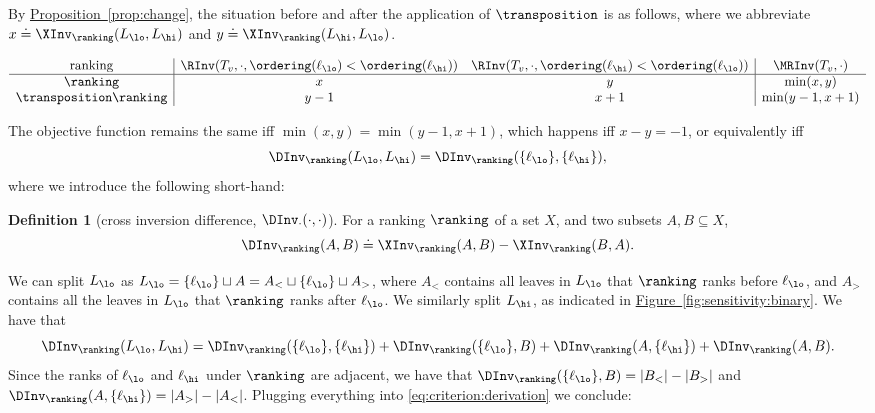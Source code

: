 \documentclass[11pt]{article}
\numberwithin{equation}{section}
\theoremstyle{definition}
\newtheorem{definition}[theorem]{Definition}
\theoremstyle{plain}
\newcommand{\expref}[2]{\hyperref[#2]{#1~\ref{#2}}}
\begin{document}
By \expref{Proposition}{prop:change}, the situation before and after the application of $\transposition$ is as follows, where we abbreviate $x \doteq \XInv_\ranking(L_\lo,L_\hi)$ and $y \doteq \XInv_\ranking(L_\hi,L_\lo)$. 

\begin{equation*}
    \begin{array}{c|cc|c}
      \text{ranking} & \RInv(T_v,\cdot, \ordering(\ell_\lo) < \ordering(\ell_\hi)) &  \RInv(T_v,\cdot, \ordering(\ell_\hi) < \ordering(\ell_\lo)) & \MRInv(T_v,\cdot) \\
      \hline
      \ranking & x & y & \min(x,y) \\
      \transposition \ranking & y-1 & x+1 & \min(y-1,x+1)
    \end{array}
\end{equation*}

The objective function remains the same iff $\min(x,y) = \min(y-1,x+1)$, which happens iff $x-y=-1$, or equivalently iff
\begin{equation}\label{eq:criterion:derivation}
\DInv_\ranking(L_\lo,L_\hi) = \DInv_\ranking(\{\ell_\lo\},\{\ell_\hi\}),
\end{equation}
where we introduce the following short-hand: 
\begin{definition}[cross inversion difference, $\DInv_{\cdot}(\cdot,\cdot)$]
For a ranking $\ranking$ of a set $X$, and two subsets $A, B \subseteq X$,
\[ \DInv_\ranking(A,B) \doteq \XInv_\ranking(A,B) - \XInv_\ranking(B,A). \]
\end{definition}
We can split $L_\lo$ as $L_\lo = \{\ell_\lo\} \sqcup A = A_< \sqcup \{\ell_\lo\} \sqcup A_>$, where $A_<$ contains all leaves in $L_\lo$ that $\ranking$ ranks before $\ell_\lo$, and $A_>$ contains all the leaves in $L_\lo$ that $\ranking$ ranks after $\ell_\lo$. We similarly split $L_\hi$, as indicated in \expref{Figure}{fig:sensitivity:binary}. We have that
\[ \DInv_\ranking(L_\lo,L_\hi) = \DInv_\ranking(\{\ell_\lo\},\{\ell_\hi\}) + \DInv_\ranking(\{\ell_\lo\},B) + \DInv_\ranking(A,\{\ell_\hi\}) + \DInv_\ranking(A,B).\]
Since the ranks of $\ell_\lo$ and $\ell_\hi$ under $\ranking$ are adjacent, we have that $\DInv_\ranking(\{\ell_\lo\},B) = |B_<| - |B_>|$ and $\DInv_\ranking(A,\{\ell_\hi\}) = |A_>| - |A_<|$. Plugging everything into \eqref{eq:criterion:derivation} we conclude:
\end{document}
